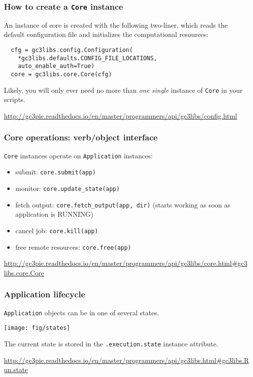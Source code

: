 \documentclass[english,serif,mathserif,xcolor=pdftex,dvipsnames,table]{beamer}
\begin{document}
\begin{frame}[fragile]
  \frametitle{How to create a \texttt{Core} instance}
  An instance of core is created with the following two-liner, which
  reads the default configuration file and initializes the
  computational resources:
\begin{lstlisting}
  cfg = gc3libs.config.Configuration(
    *gc3libs.defaults.CONFIG_FILE_LOCATIONS,
    auto_enable_auth=True)
  core = gc3libs.core.Core(cfg)
\end{lstlisting}

\+
Likely, you will only ever need no more than \emph{one single}
instance of \texttt{Core} in your scripts.

\+
\begin{references}
  \url{http://gc3pie.readthedocs.io/en/master/programmers/api/gc3libs/config.html}
\end{references}
\end{frame}


\begin{frame}[fragile]
\frametitle{Core operations: verb/object interface}

\texttt{Core} instances operate on \texttt{Application} instances:
\begin{itemize}
\item submit: \texttt{core.submit(app)}
\item monitor: \texttt{core.update\_state(app)}
\item fetch output: \texttt{core.fetch\_output(app, dir)} (starts working as soon as
    application is RUNNING)
\item cancel job: \texttt{core.kill(app)}
\item free remote resources: \texttt{core.free(app)}
\end{itemize}

\+
\begin{references}
  \url{http://gc3pie.readthedocs.io/en/master/programmers/api/gc3libs/core.html#gc3libs.core.Core}
\end{references}
\end{frame}

\begin{frame}[fragile]
\frametitle{Application lifecycle}

\texttt{Application} objects can be in one of several states.
\+
\begin{center}
  \texttt{[image: fig/states]}
\end{center}
\+
The current state is stored in the \texttt{.execution.state} instance attribute.

\+
\begin{references}
  \url{http://gc3pie.readthedocs.io/en/master/programmers/api/gc3libs.html#gc3libs.Run.state}
\end{references}
\end{frame}
\end{document}
